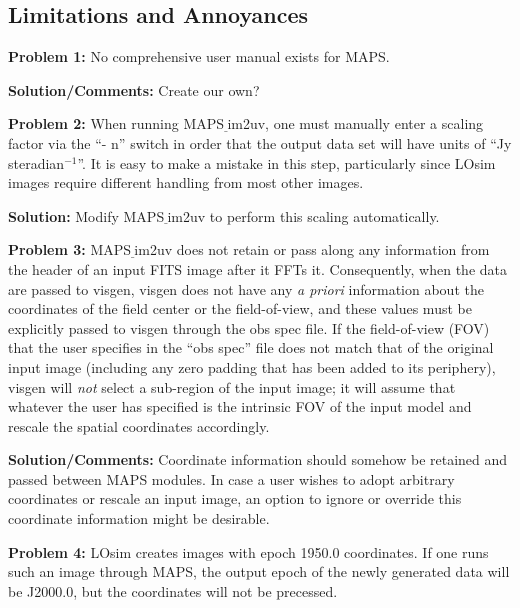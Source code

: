 \documentclass[12pt]{article}
\begin{document}
\begin{flushleft}

\section{Limitations and Annoyances}


{\bf{\color{red} Problem 1:}} No comprehensive user manual exists for MAPS. 

{\bf Solution/Comments:} Create our own?
\bigskip

{\bf {\color{red}Problem 2:}} When running {\sf MAPS$\underline~$im2uv}, 
one must manually enter a scaling factor via the ``- n''
  switch  in
  order that the output data set will have units of ``Jy
  steradian$^{-1}$''. It is easy to make a mistake in this step,
  particularly since LOsim images require different handling from most
  other images.

{\bf Solution:} Modify
{\sf MAPS$\underline~$im2uv} to perform this scaling automatically.

\bigskip

{\bf {\color{red}Problem 3:}} {\sf MAPS$\underline~$im2uv} does not
retain or pass along 
any information from the header of an input FITS
image after it FFTs  it.
Consequently, when the data are passed to 
{\sf visgen},  {\sf visgen} does not have any {\it a priori}
information about the coordinates of the
field center or the field-of-view, and these values must
be explicitly passed to {\sf visgen} through the obs spec file. 
If the field-of-view (FOV) that the user specifies
in the ``obs spec'' file does not match that of the original input
image (including any zero padding that has been added to its
periphery), {\sf
visgen} will {\it not} select a sub-region of the input image; it
will assume that whatever the user has specified is the intrinsic 
FOV of the input model and rescale the spatial coordinates accordingly.


{\bf Solution/Comments:} Coordinate information should somehow be retained and passed
between MAPS modules. In case a user wishes to adopt
arbitrary coordinates or rescale an input image, an option 
to ignore or override this coordinate information might be desirable. 

\bigskip

{\bf {\color{red}Problem 4:}} {\sf LOsim} creates images with epoch 1950.0
coordinates. If one runs such an image through MAPS, the output epoch
of the newly generated data will be
J2000.0, but the coordinates will not be precessed.


\end{flushleft}
\end{document}
